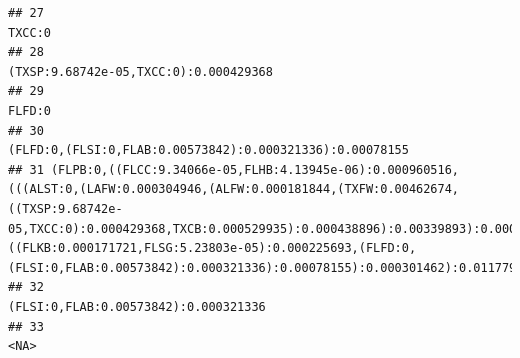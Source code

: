 \documentclass[]{article}
\begin{document}
\begin{verbatim}
## 27                                                                                                                                                                                                                                                                                                                                                                                                            TXCC:0
## 28                                                                                                                                                                                                                                                                                                                                                                             (TXSP:9.68742e-05,TXCC:0):0.000429368
## 29                                                                                                                                                                                                                                                                                                                                                                                                            FLFD:0
## 30                                                                                                                                                                                                                                                                                                                                                          (FLFD:0,(FLSI:0,FLAB:0.00573842):0.000321336):0.00078155
## 31 (FLPB:0,((FLCC:9.34066e-05,FLHB:4.13945e-06):0.000960516,(((ALST:0,(LAFW:0.000304946,(ALFW:0.000181844,(TXFW:0.00462674,((TXSP:9.68742e-05,TXCC:0):0.000429368,TXCB:0.000529935):0.000438896):0.00339893):0.000450879):0.000633288):0.00274534,((FLKB:0.000171721,FLSG:5.23803e-05):0.000225693,(FLFD:0,(FLSI:0,FLAB:0.00573842):0.000321336):0.00078155):0.000301462):0.0117792,FLLG:0.0165186):0.000474876):0);
## 32                                                                                                                                                                                                                                                                                                                                                                              (FLSI:0,FLAB:0.00573842):0.000321336
## 33                                                                                                                                                                                                                                                                                                                                                                                                              <NA>

\end{verbatim}
\end{document}
